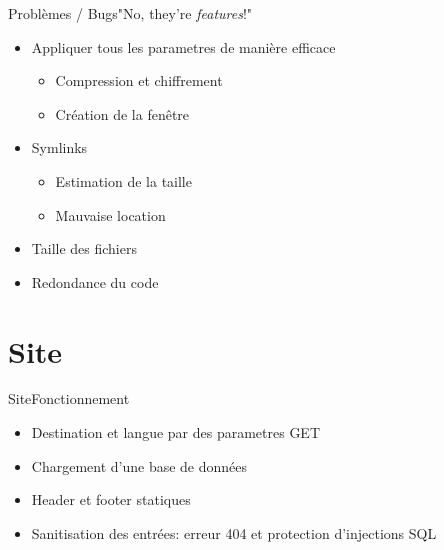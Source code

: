 \documentclass{beamer}
\begin{document}
	\begin{frame}{Problèmes / Bugs}{"No, they're \textit{features}!"}
		\begin{itemize}
			\item Appliquer tous les parametres de manière efficace
			\begin{itemize}
				\item Compression et chiffrement
				\item Création de la fenêtre
			\end{itemize}
			\item Symlinks
			\begin{itemize}
				\item Estimation de la taille
				\item Mauvaise location
			\end{itemize}
			\item Taille des fichiers
			\item Redondance du code
		\end{itemize}
	\end{frame}

	\section{Site}
	\begin{frame}{Site}{Fonctionnement}
		\begin{itemize}
			\item Destination et langue par des parametres GET
			\item Chargement d'une base de données
			\item Header et footer statiques
			\item Sanitisation des entrées: erreur 404 et protection d'injections SQL
		\end{itemize}
	\end{frame}
\end{document}
